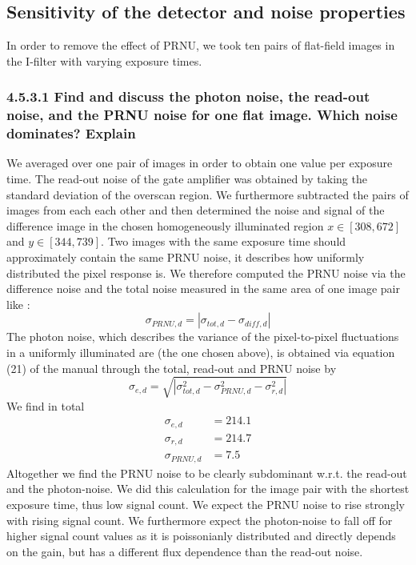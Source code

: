 \subsection{Sensitivity of the detector and noise properties}


In order to remove the effect of PRNU, we took ten pairs of flat-field images in the I-filter with varying exposure times.

\subsubsection{4.5.3.1 Find and discuss the photon noise, the read-out noise, and the PRNU noise for one flat image. Which noise dominates? Explain}
\label{sec:5}
We averaged over one pair of images in order to obtain one value per exposure time. The read-out noise of the gate amplifier was obtained by taking the standard deviation of the overscan region.
We furthermore subtracted the pairs of images from each each other and then determined the noise and signal of the difference image in the chosen homogeneously illuminated region $x\in \left[308,672\right]$ and $y\in \left[344,739\right]$.
Two images with the same exposure time should approximately contain the same PRNU noise, it describes how uniformly distributed the pixel response is. We therefore computed the PRNU noise via the difference noise and the total noise measured in the same area of one image pair like :
\begin{equation}
\label{eq:1}
	\sigma_{PRNU,d} = |\sigma_{tot,d}-\sigma_{diff,d}|
\end{equation}
\noindent
 The photon noise, which describes the variance of the pixel-to-pixel fluctuations in a uniformly illuminated are (the one chosen above), is obtained via equation (21) of the manual through the total, read-out and PRNU noise by
 \begin{equation}
 \label{eq:2}
 	\sigma_{e,d}=	\sqrt{|\sigma_{tot,d}^{2}-\sigma_{PRNU,d}^{2}-\sigma_{r,d}^{2}|}
 \end{equation}
 We find in total
 \begin{align*}
	 \sigma_{e,d} &= 214.1 \\
	 \sigma_{r,d} &= 214.7 \\
	 \sigma_{PRNU,d} &= 7.5 
 \end{align*}
Altogether we find the PRNU noise to be clearly subdominant w.r.t. the read-out and the photon-noise. We did this calculation for the image pair with the shortest exposure time, thus low signal count. We expect the PRNU noise to rise strongly with rising signal count. We furthermore expect the photon-noise to fall off for higher signal count values as it is poissonianly distributed and directly depends on the gain, but has a different flux dependence than the read-out noise.\\
